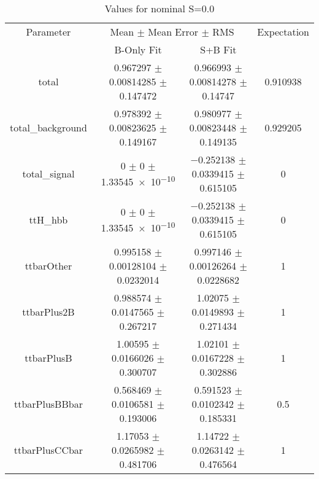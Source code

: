 \begin{table}
\centering
\caption{Values for nominal S=0.0}
\begin{tabular}{cccc}
\toprule
Parameter & \multicolumn{2}{c}{Mean $\pm$ Mean Error $\pm$ RMS} & Expectation\\
 & B-Only Fit & S+B Fit & \\
\midrule
total & \num{0.967297} $\pm$ \num{0.00814285} $\pm$ \num{0.147472} & \num{0.966993} $\pm$ \num{0.00814278} $\pm$ \num{0.14747} & \num{0.910938}\\
total\_background & \num{0.978392} $\pm$ \num{0.00823625} $\pm$ \num{0.149167} & \num{0.980977} $\pm$ \num{0.00823448} $\pm$ \num{0.149135} & \num{0.929205}\\
total\_signal & \num{0} $\pm$ \num{0} $\pm$ \num{1.33545e-10} & \num{-0.252138} $\pm$ \num{0.0339415} $\pm$ \num{0.615105} & \num{0}\\
ttH\_hbb & \num{0} $\pm$ \num{0} $\pm$ \num{1.33545e-10} & \num{-0.252138} $\pm$ \num{0.0339415} $\pm$ \num{0.615105} & \num{0}\\
ttbarOther & \num{0.995158} $\pm$ \num{0.00128104} $\pm$ \num{0.0232014} & \num{0.997146} $\pm$ \num{0.00126264} $\pm$ \num{0.0228682} & \num{1}\\
ttbarPlus2B & \num{0.988574} $\pm$ \num{0.0147565} $\pm$ \num{0.267217} & \num{1.02075} $\pm$ \num{0.0149893} $\pm$ \num{0.271434} & \num{1}\\
ttbarPlusB & \num{1.00595} $\pm$ \num{0.0166026} $\pm$ \num{0.300707} & \num{1.02101} $\pm$ \num{0.0167228} $\pm$ \num{0.302886} & \num{1}\\
ttbarPlusBBbar & \num{0.568469} $\pm$ \num{0.0106581} $\pm$ \num{0.193006} & \num{0.591523} $\pm$ \num{0.0102342} $\pm$ \num{0.185331} & \num{0.5}\\
ttbarPlusCCbar & \num{1.17053} $\pm$ \num{0.0265982} $\pm$ \num{0.481706} & \num{1.14722} $\pm$ \num{0.0263142} $\pm$ \num{0.476564} & \num{1}\\
\bottomrule
\end{tabular}
\end{table}